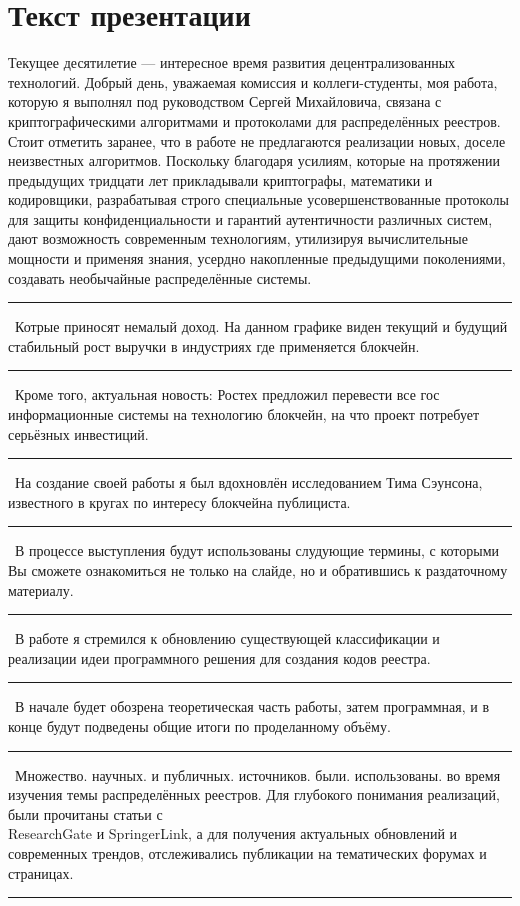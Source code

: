 \documentclass[12pt]{article}
\renewcommand{\line}{\noindent\rule{\textwidth}{1pt}}
\begin{document}
\section*{Текст презентации}
Текущее  десятилетие --- интересное время развития децентрализованных
технологий. Добрый день, уважаемая комиссия и коллеги-студенты, моя работа,
которую я выполнял под руководством Сергей Михайловича, связана с
криптографическими алгоритмами и протоколами для распределённых реестров.
Стоит отметить заранее, что в работе не предлагаются реализации новых, доселе
неизвестных алгоритмов. Поскольку благодаря усилиям,  которые  на  протяжении
предыдущих тридцати  лет  прикладывали криптографы,  математики  и кодировщики,
разрабатывая  строго  специальные усовершенствованные  протоколы для  защиты
конфиденциальности  и гарантий аутентичности  различных  систем, дают
возможность современным технологиям, утилизируя вычислительные мощности и
применяя знания, усердно накопленные предыдущими поколениями, создавать
необычайные распределённые системы.\\
\line\
Котрые приносят немалый доход. На данном графике виден текущий и будущий
стабильный рост выручки в индустриях где применяется блокчейн.\\
\line\
Кроме того, актуальная новость: Ростех предложил перевести все гос
информационные системы на технологию блокчейн, на что проект потребует
серьёзных инвестиций.
\line\
На создание своей работы я был вдохновлён исследованием Тима Сэунсона,
известного в кругах по интересу блокчейна публициста.\\
\line\
В процессе выступления будут использованы слудующие термины, с которыми Вы
сможете ознакомиться не только на слайде, но и обратившись к раздаточному
материалу.\\
\line\
В работе я стремился к обновлению существующей классификации и реализации идеи
программного решения для создания кодов реестра.\\
\line\
В начале будет обозрена теоретическая часть работы, затем программная, и в
конце будут подведены общие итоги по проделанному объёму.\\
\line\
Множество. научных. и публичных. источников. были. использованы. во время
изучения темы распределённых реестров. Для глубокого понимания реализаций, были
прочитаны статьи с\\ResearchGate и SpringerLink, а для получения актуальных
обновлений и современных трендов, отслеживались публикации на тематических
форумах и страницах.\\
\line\\
\end{document}
